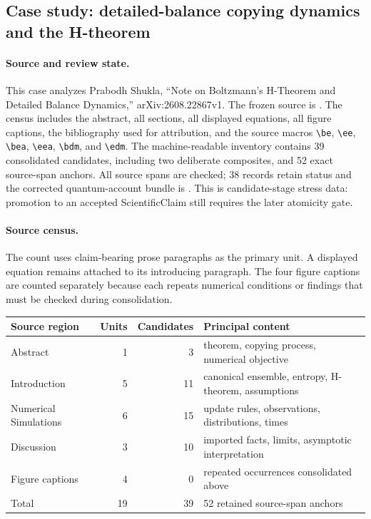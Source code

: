 \subsection{Case study: detailed-balance copying dynamics and the H-theorem}\label{case:2608-22867}

\paragraph{Source and review state.}
This case analyzes Prabodh Shukla, ``Note on Boltzmann's H-Theorem and Detailed Balance Dynamics,'' arXiv:2608.22867v1. The frozen source is . The census includes the abstract, all sections, all displayed equations, all figure captions, the bibliography used for attribution, and the source macros \texttt{\textbackslash be}, \texttt{\textbackslash ee}, \texttt{\textbackslash bea}, \texttt{\textbackslash eea}, \texttt{\textbackslash bdm}, and \texttt{\textbackslash edm}. The machine-readable inventory contains 39 consolidated candidates, including two deliberate composites, and 52 exact source-span anchors. All source spans are checked; 38 records retain  status and the corrected quantum-account bundle is . This is candidate-stage stress data: promotion to an accepted ScientificClaim still requires the later atomicity gate.

\paragraph{Source census.}
The count uses claim-bearing prose paragraphs as the primary unit. A displayed equation remains attached to its introducing paragraph. The four figure captions are counted separately because each repeats numerical conditions or findings that must be checked during consolidation.

\begin{center}
\small
\begin{tabular}{lrrl}
\toprule
Source region & Units & Candidates & Principal content \\
\midrule
Abstract & 1 & 3 & theorem, copying process, numerical objective \\
Introduction & 5 & 11 & canonical ensemble, entropy, H-theorem, assumptions \\
Numerical Simulations & 6 & 15 & update rules, observations, distributions, times \\
Discussion & 3 & 10 & imported facts, limits, asymptotic interpretation \\
Figure captions & 4 & 0 & repeated occurrences consolidated above \\
\midrule
Total & 19 & 39 & 52 retained source-span anchors \\
\bottomrule
\end{tabular}
\end{center}

